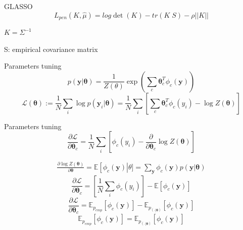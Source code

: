 \documentclass{beamer}
\begin{document}
\begin{frame}{GLASSO}
\begin{equation}
L_{pen}(K,\hat{\mu})=log\det(K)-tr(K\;S)-\rho||K|| 
\end{equation}
\begin{center}
$K=\Sigma^{-1}$
\end{center}
\begin{center}
S: empirical covariance matrix
\end{center}
\end{frame}

\begin{frame}{Parameters tuning}
\begin{equation}
p\left(\textbf{y}|\boldsymbol{\theta}\right) = \dfrac{1}{Z(\theta)}\exp \left( \sum_{c}\boldsymbol{\theta}^{T}_{c}\phi_{c}\left(\textbf{y}\right)\right)
\end{equation}
\begin{equation}
\mathcal{L}\left(\boldsymbol{\theta}\right):= \frac{1}{N}\sum_{i}\log p\left(\textbf{y}_{i}|\boldsymbol{\theta}\right)=\frac{1}{N}\sum_{i}\left[\sum_{c} \boldsymbol{\theta}^{T}_{c}\phi_{c}(y_{i})-\log Z\left(\boldsymbol{\theta}\right)\right]
\end{equation}
\end{frame}


\begin{frame}{Parameters tuning}
\begin{equation}
\frac{\partial\mathcal{L}}{\partial\boldsymbol{\theta}_{c}}=\frac{1}{N}\sum_{i}\left[\phi_{c}(y_{i})-\frac{\partial}{\partial\boldsymbol{\theta}_{c}}\log Z(\boldsymbol{\theta})\right]
\end{equation}

\begin{equation}
\begin{split}
\frac{\partial \log Z(\boldsymbol{\theta})}{\partial\boldsymbol{\theta}}=\mathbb{E}\left[\phi_{c}(\textbf{y})\right|\theta]= \sum_{\textbf{y}}\phi_{c}(\textbf{y})p(\textbf{y}|\boldsymbol{\theta})
\end{split}
\end{equation}
\begin{equation}
\frac{\partial\mathcal{L}}{\partial\boldsymbol{\theta}_{c}}=\left[\frac{1}{N}\sum_{i}\phi_{c}(y_{i})\right]-\mathbb{E}\left[\phi_{c}(\textbf{y})\right]
\end{equation}
\begin{equation}
\frac{\partial\mathcal{L}}{\partial\boldsymbol{\theta}_{c}}=\mathbb{E}_{p_{emp}}\left[\phi_{c}(\textbf{y})\right]-\mathbb{E}_{p_{(\cdot|\boldsymbol{\theta})}}\left[\phi_{c}(\textbf{y})\right]
\end{equation}
\begin{equation}
\mathbb{E}_{p_{emp}}\left[\phi_{c}(\textbf{y})\right]=\mathbb{E}_{p_{(\cdot|\boldsymbol{\theta})}}\left[\phi_{c}(\textbf{y})\right]
\end{equation}
\end{frame}
\end{document}
